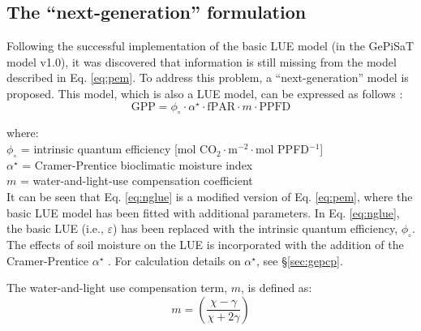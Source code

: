 \subsection{The ``next-generation'' formulation}
\label{sec:mst2nxtgen}

Following the successful implementation of the basic LUE model (in the GePiSaT model v1.0), it was discovered that information is still missing from the model described in Eq. \ref{eq:pem}. 
To address this problem, a ``next-generation'' model is proposed. 
This model, which is also a LUE model, can be expressed as follows \parencite[Eq. 8]{wang12}:
%
\begin{equation}
\label{eq:nglue}
    \text{GPP} = \phi_{\circ} \cdot \alpha^{\star} \cdot \text{fPAR} \cdot
                 m \cdot \text{PPFD}
\end{equation}

\noindent where:\\
\indent $\phi_{\circ}$ = intrinsic quantum efficiency [mol CO$_{2}\cdot$m$^{-2}\cdot$mol PPFD$^{-1}$]\\
\indent $\alpha^{\star}$ = Cramer-Prentice bioclimatic moisture index\\
\indent $m$ = water-and-light-use compensation coefficient\\

It can be seen that Eq. \ref{eq:nglue} is a modified version of Eq. \ref{eq:pem}, where the basic LUE model has been fitted with additional parameters.  
In Eq. \ref{eq:nglue}, the basic LUE (i.e., $\varepsilon$) has been replaced with the intrinsic quantum efficiency, $\phi_{\circ}$. The effects of soil moisture on the LUE is incorporated with the addition of the Cramer-Prentice $\alpha^{\star}$ \parencite{prentice93, gallego-sala10}.  
For calculation details on $\alpha^{\star}$, see \S \ref{sec:gepcp}.

The water-and-light use compensation term, $m$, is defined as:
%
\begin{equation}
\label{eq:m}
    m = \left( \frac{\chi - \gamma}{\chi + 2 \gamma}  \right) 
\end{equation}

